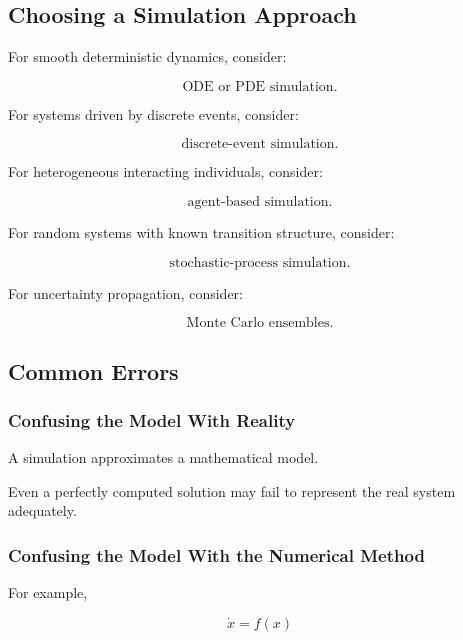 \subsection{Choosing a Simulation Approach}
\label{subsec:choosing-simulation-approach}

For smooth deterministic dynamics, consider:

\[
\boxed{
\text{ODE or PDE simulation}.
}
\]

For systems driven by discrete events, consider:

\[
\boxed{
\text{discrete-event simulation}.
}
\]

For heterogeneous interacting individuals, consider:

\[
\boxed{
\text{agent-based simulation}.
}
\]

For random systems with known transition structure, consider:

\[
\boxed{
\text{stochastic-process simulation}.
}
\]

For uncertainty propagation, consider:

\[
\boxed{
\text{Monte Carlo ensembles}.
}
\]

\subsection{Common Errors}
\label{subsec:mathematical-simulation-common-errors}

\subsubsection{Confusing the Model With Reality}

A simulation approximates a mathematical model.

Even a perfectly computed solution may fail to represent the real system
adequately.

\subsubsection{Confusing the Model With the Numerical Method}

For example,

\[
\dot{x}=f(x)
\]

